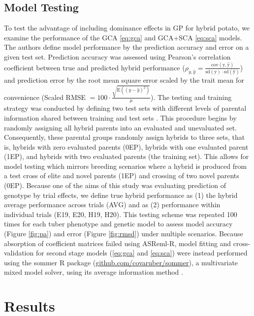 \subsection{Model Testing}

To test the advantage of including dominance effects in GP for hybrid potato, we examine the performance of the GCA \eqref{eq:gca} and GCA+SCA \eqref{eq:sca} models. The authors define model performance by the prediction accuracy and error on a given test set. Prediction accuracy was assessed using Pearson's correlation coefficient between true and predicted hybrid performance (\(\rho_{y,\hat{y}} = \frac{\mathrm{cov(y,\hat{y})}}{\mathrm{sd(y)\cdot sd(\hat{y})}}\)) and prediction error by the root mean square error scaled by the trait mean for convenience (Scaled RMSE \(= 100\cdot\frac{\sqrt{\mathrm E((y-\hat{y})^2)}}{\mu}\)). The testing and training strategy was conducted by defining two test sets with different levels of parental information shared between training and test sets \parencite{Schrag2009}. This procedure begins by randomly assigning all hybrid parents into an evaluated and unevaluated set. Consequently, these parental groups randomly assign hybrids to three sets, that is, hybrids with zero evaluated parents (0EP), hybrids with one evaluated parent (1EP), and hybrids with two evaluated parents (the training set). This allows for model testing which mirrors breeding scenarios where a hybrid is produced from a test cross of elite and novel parents (1EP) and crossing of two novel parents (0EP). Because one of the aims of this study was evaluating prediction of genotype by trial effects, we define true hybrid performance as (1) the hybrid average performance across trials (AVG) and as (2) performance within individual trials (E19, E20, H19, H20). This testing scheme was repeated 100 times for each tuber phenotype and genetic model to assess model accuracy (Figure \ref{fig:pa}) and error (Figure \ref{fig:rmsd}) under multiple scenarios. Because absorption of coefficient matrices failed using ASReml-R, model fitting and cross-validation for second stage models (\ref{eq:gca} and \ref{eq:sca}) were instead performed using the sommer R package (\href{https://github.com/covaruber/sommer}{github.com/covaruber/sommer}), a multivariate mixed model solver, using its average information method \parencite{Covarrubias-Pazaran2016}.

\section{Results}


